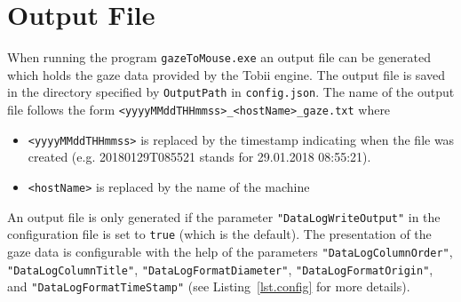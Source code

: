 \documentclass[a4paper,oneside]{book}
\begin{document}
\section{Output File}
When running the program \texttt{gazeToMouse.exe} an output file can be generated which holds the gaze data provided by the Tobii engine.
The output file is saved in the directory specified by \texttt{OutputPath} in \texttt{config.json}.
The name of the output file follows the form \texttt{<yyyyMMddTHHmmss>\_<hostName>\_gaze.txt} where

\begin{itemize}
    \item \texttt{<yyyyMMddTHHmmss>} is replaced by the timestamp indicating when the file was created (e.g. 20180129T085521 stands for 29.01.2018 08:55:21).
    \item \texttt{<hostName>} is replaced by the name of the machine
\end{itemize}

An output file is only generated if the parameter \texttt{"DataLogWriteOutput"} in the configuration file is set to \texttt{true} (which is the default).
The presentation of the gaze data is configurable with the help of the parameters \texttt{"DataLogColumnOrder"}, \texttt{"DataLogColumnTitle"}, \texttt{"DataLogFormatDiameter"}, \texttt{"DataLogFormatOrigin"}, and \texttt{"DataLogFormatTimeStamp"} (see Listing~\ref{lst.config} for more details).
\end{document}
